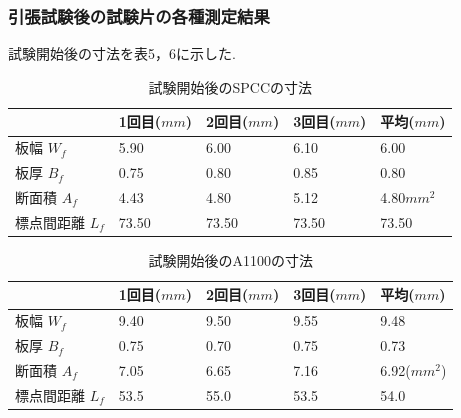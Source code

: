 \documentclass[10pt，a4j]{jsarticle}
\begin{document}
  \subsubsection{引張試験後の試験片の各種測定結果}
    試験開始後の寸法を表5，6に示した.
    \begin{table}[H]
      \centering
      \caption{試験開始後のSPCCの寸法}
      \label{my-label}
        \footnotesize
        \begin{tabular}{lllll}
                      & 1回目($mm$) & 2回目($mm$) & 3回目($mm$) & 平均($mm$) \\ \hline
        板幅 $W_{f}$    & 5.90   & 6.00   & 6.10   & 6.00  \\
        板厚 $B_{f}$    & 0.75   & 0.80   & 0.85   & 0.80   \\
        断面積 $A_{f}$   & 4.43   & 4.80   & 5.12   & 4.80$mm^{2}$  \\
        標点間距離 $L_{f}$ & 73.50    & 73.50    & 73.50    & 73.50 
      \end{tabular}
    \end{table}
    \begin{table}[H]
      \centering
      \caption{試験開始後のA1100の寸法}
      \label{my-label}
        \footnotesize
        \begin{tabular}{lllll}
                      & 1回目($mm$) & 2回目($mm$) & 3回目($mm$) & 平均($mm$) \\ \hline
        板幅 $W_{f}$    & 9.40   & 9.50   & 9.55   & 9.48  \\
        板厚 $B_{f}$    & 0.75   & 0.70   & 0.75   & 0.73   \\
        断面積 $A_{f}$   & 7.05   & 6.65   & 7.16   & 6.92($mm^{2}$)  \\
        標点間距離 $L_{f}$ & 53.5    & 55.0    & 53.5    & 54.0
      \end{tabular}
    \end{table}
\end{document}
